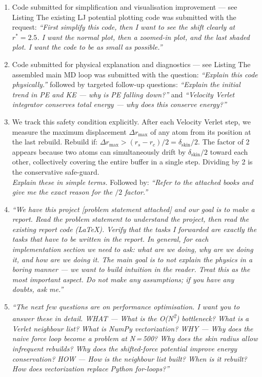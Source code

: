 \begin{enumerate}
\item Code submitted for simplification and visualisation improvement --- see Listing
      The existing LJ potential plotting code was submitted with the request:
      \textit{``First simplify this code, then I want to see the shift clearly
      at $r^* = 2.5$. I want the normal plot, then a zoomed-in plot, and the
      last shaded plot. I want the code to be as small as possible.''}
 
\item Code submitted for physical explanation and diagnostics --- see Listing
      The assembled main MD loop was submitted with the question:
      \textit{``Explain this code physically.''} followed by targeted
      follow-up questions: \textit{``Explain the initial trend in PE and KE ---
      why is PE falling down?''} and \textit{``Velocity Verlet integrator
      conserves total energy --- why does this conserve energy?''}
 
\item We track this safety condition explicitly. After each Velocity Verlet
      step, we measure the maximum displacement $\Delta r_\text{max}$ of any
      atom from its position at the last rebuild. Rebuild if:
      $\Delta r_\text{max} > (r_s - r_c)/2 = \delta_\text{skin}/2$.
      The factor of 2 appears because two atoms can simultaneously drift by
      $\delta_\text{skin}/2$ toward each other, collectively covering the entire
      buffer in a single step. Dividing by 2 is the conservative safe-guard.\\
      \textit{Explain these in simple terms.}
      Followed by: \textit{``Refer to the attached books and give me the exact
      reason for the $/2$ factor.''}

\item \textit{``We have this project [problem statement attached] and our goal is to make a
    report. Read the problem statement to understand the project, then read the existing report
    code (LaTeX). Verify that the tasks I forwarded are exactly the tasks that have to be written in
    the report. In general, for each implementation section we need to ask: what are we doing, why
    are we doing it, and how are we doing it. The main goal is to not explain the physics in a
    boring manner --- we want to build intuition in the reader. Treat this as the most important
    aspect. Do not make any assumptions; if you have any doubts, ask me.''}
 
    \item \textit{``The next few questions are on performance optimisation. I want you to answer
    these in detail. WHAT --- What is the O(N\textsuperscript{2}) bottleneck? What is a Verlet
    neighbour list? What is NumPy vectorization? WHY --- Why does the naive force loop become
    a problem at N\,=\,500? Why does the skin radius allow infrequent rebuilds? Why does the
    shifted-force potential improve energy conservation? HOW --- How is the neighbour list built?
    When is it rebuilt? How does vectorization replace Python for-loops?''}
 

\end{enumerate}
